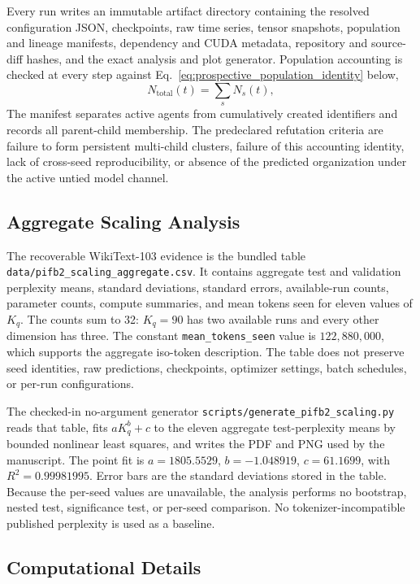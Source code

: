 \documentclass[11pt]{article}
\begin{document}
Every run writes an immutable artifact directory containing the resolved configuration JSON, checkpoints, raw time series, tensor snapshots, population and lineage manifests, dependency and CUDA metadata, repository and source-diff hashes, and the exact analysis and plot generator. Population accounting is checked at every step against Eq.~\eqref{eq:prospective_population_identity} below,
\begin{equation}
N_{\mathrm{total}}(t)=\sum_s N_s(t),
\label{eq:prospective_population_identity}
\end{equation}
The manifest separates active agents from cumulatively created identifiers and records all parent-child membership. The predeclared refutation criteria are failure to form persistent multi-child clusters, failure of this accounting identity, lack of cross-seed reproducibility, or absence of the predicted organization under the active untied model channel.


\subsection{Aggregate Scaling Analysis}
\label{sec:methods_scaling}

The recoverable WikiText-103 evidence is the bundled table \texttt{data/pifb2\_scaling\_aggregate.csv}. It contains aggregate test and validation perplexity means, standard deviations, standard errors, available-run counts, parameter counts, compute summaries, and mean tokens seen for eleven values of $K_q$. The counts sum to 32: $K_q=90$ has two available runs and every other dimension has three. The constant \texttt{mean\_tokens\_seen} value is $122{,}880{,}000$, which supports the aggregate iso-token description. The table does not preserve seed identities, raw predictions, checkpoints, optimizer settings, batch schedules, or per-run configurations.

The checked-in no-argument generator \texttt{scripts/generate\_pifb2\_scaling.py} reads that table, fits $aK_q^b+c$ to the eleven aggregate test-perplexity means by bounded nonlinear least squares, and writes the PDF and PNG used by the manuscript. The point fit is $a=1805.5529$, $b=-1.048919$, $c=61.1699$, with $R^2=0.99981995$. Error bars are the standard deviations stored in the table. Because the per-seed values are unavailable, the analysis performs no bootstrap, nested test, significance test, or per-seed comparison. No tokenizer-incompatible published perplexity is used as a baseline.


\subsection{Computational Details}
\end{document}
